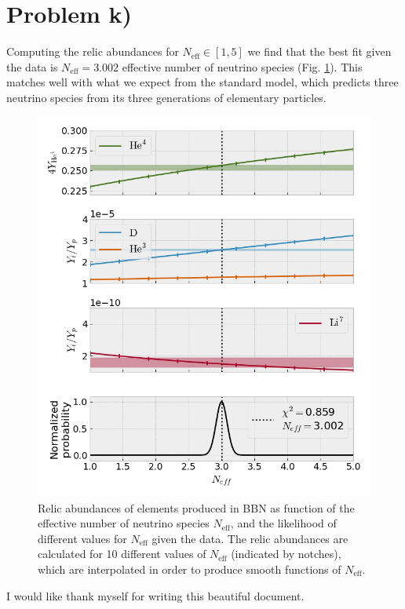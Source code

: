 \documentclass[reprint,english,notitlepage]{revtex4-1}  %
\numberwithin{equation}{section}
\begin{document}
\section{Problem k)}
Computing the relic abundances for $N_{\mathrm{eff}} \in [1, 5]$ we find that
the best fit given the data is $N_{\mathrm{eff}}=3.002$ effective number of
neutrino species (Fig. \ref{fig:problem_k}). This matches well with what we
expect from the standard model, which predicts three neutrino species from its
three generations of elementary particles.
\begin{figure}[h]
	\includegraphics[width=\columnwidth]{relic_abundances_k.png}
	\caption{Relic abundances of elements produced in BBN as function of the
					effective number of neutrino species $N_{\mathrm{eff}}$, and the
					likelihood of different values for $N_{\mathrm{eff}}$ given the data.
					The relic abundances are calculated for 10 different values of
					$N_{\mathrm{eff}}$ (indicated by notches), which are interpolated in
					order to produce smooth functions of $N_{\mathrm{eff}}$.}
	\label{fig:problem_k}
\end{figure}



\begin{acknowledgments}  %
I would like thank myself for writing this beautiful document.
\end{acknowledgments}
\end{document}
